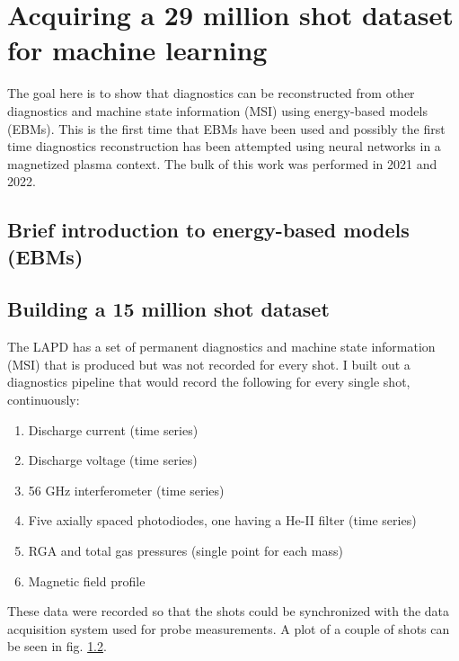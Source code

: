 \graphicspath{{../Thesis/Appendix/appendix_29m-shots/}}

\chapter{Acquiring a 29 million shot dataset for machine learning}

The goal here is to show that diagnostics can be reconstructed from other diagnostics and machine state information (MSI) using energy-based models (EBMs). This is the first time that EBMs have been used and possibly the first time diagnostics reconstruction has been attempted using neural networks in a magnetized plasma context. The bulk of this work was performed in 2021 and 2022.  

\section{Brief introduction to energy-based models (EBMs)}

\section{Building a 15 million shot dataset}

The LAPD has a set of permanent diagnostics and machine state information (MSI) that is produced but was not recorded for every shot. I built out a diagnostics pipeline that would record the following for every single shot, continuously:
\begin{enumerate}
	\item Discharge current (time series)
	\item Discharge voltage (time series)
	\item 56 GHz interferometer (time series)
	\item Five axially spaced photodiodes, one having a He-II filter (time series)
	\item RGA and total gas pressures (single point for each mass)
	\item Magnetic field profile
\end{enumerate}
These data were recorded so that the shots could be synchronized with the data acquisition system used for probe measurements. A plot of a couple of shots can be seen in fig. \ref{}.

